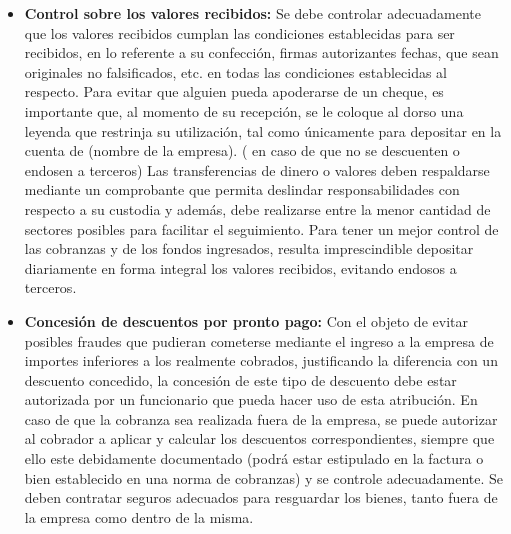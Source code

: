 \begin{itemize}
\item \textbf{Control sobre los valores recibidos:}
Se debe controlar adecuadamente que los valores recibidos cumplan las condiciones establecidas
para ser recibidos, en lo referente a su confección, firmas autorizantes fechas, que sean originales no
falsificados, etc. en todas las condiciones establecidas al respecto.
Para evitar que alguien pueda apoderarse de un cheque, es importante que, al momento de su
recepción, se le coloque al dorso una leyenda que restrinja su utilización, tal como únicamente para
depositar en la cuenta de (nombre de la empresa). ( en caso de que no se descuenten o endosen a
terceros)
Las transferencias de dinero o valores deben respaldarse mediante un comprobante que permita
deslindar responsabilidades con respecto a su custodia y además, debe realizarse entre la menor cantidad
de sectores posibles para facilitar el seguimiento.
Para tener un mejor control de las cobranzas y de los fondos ingresados, resulta imprescindible
depositar diariamente en forma integral los valores recibidos, evitando endosos a terceros.

\item \textbf{Concesión de descuentos por pronto pago:}
Con el objeto de evitar posibles fraudes que pudieran cometerse mediante el ingreso a la empresa
de importes inferiores a los realmente cobrados, justificando la diferencia con un descuento concedido, la
concesión de este tipo de descuento debe estar autorizada por un funcionario que pueda hacer uso de esta
atribución.
En caso de que la cobranza sea realizada fuera de la empresa, se puede autorizar al cobrador a
aplicar y calcular los descuentos correspondientes, siempre que ello este debidamente documentado (podrá
estar estipulado en la factura o bien establecido en una norma de cobranzas) y se controle adecuadamente.
Se deben contratar seguros adecuados para resguardar los bienes, tanto fuera de la empresa como dentro
de la misma.

\end{itemize}

